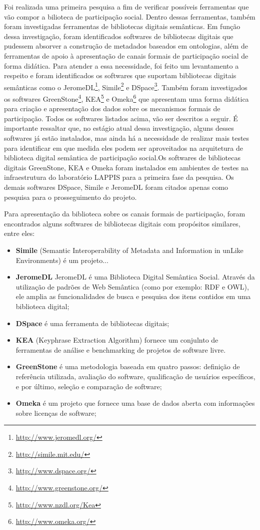 Foi realizada uma primeira pesquisa a fim de verificar possíveis ferramentas que vão compor a bilioteca de participação social. Dentro dessas ferramentas, também foram investigadas ferramentas de bibliotecas digitais semânticas. Em função dessa investigação, foram identificados softwares de bibliotecas digitais que pudessem absorver a construção de metadados baseados em ontologias, além de ferramentas de apoio à apresentação de canais formais de participação social de forma didática. 
%
Para atender a essa necessidade, foi feito um levantamento a respeito e foram identificados os softwares que suportam bibliotecas digitais semânticas como  o JeromeDL\footnote{\url{http://www.jeromedl.org/}}, Simile\footnote{\url{http://simile.mit.edu/}} e DSpace\footnote{\url{http://www.dspace.org/}}. Também foram investigados os softwares GreenStone\footnote{\url{http://www.greenstone.org/}}, KEA\footnote{\url{http://www.nzdl.org/Kea}} e Omeka\footnote{\url{http://www.omeka.org/}} que apresentam uma forma didática para criação e apresentação dos dados sobre os mecanismos formais de participação. Todos os softwares listados acima, vão ser descritos a seguir.
%
É importante ressaltar que, no estágio atual dessa investigação, alguns desses softwares já estão instalados, mas ainda há a necessidade de realizar mais testes para identificar em que medida eles podem ser aproveitados na arquitetura de biblioteca digital semântica de participação social.Os softwares  de bibliotecas digitais GreenStone, KEA e Omeka foram instalados em ambientes de testes na infraestrutura do laboratório LAPPIS para a primeira fase da pesquisa. Os demais softwares DSpace, Simile e JeromeDL foram citados apenas como pesquisa para o prosseguimento do projeto.

Para apresentação da biblioteca sobre os canais formais de participação, foram encontrados alguns softwares de bibliotecas digitais com propósitos similares, entre eles:

\begin{itemize}
\item \textbf{Simile} (Semantic Interoperability of Metadata and Information in unLike Environments) é um projeto...
\item \textbf{JeromeDL} JeromeDL é uma Biblioteca Digital Semântica Social. Através da utilização de padrões de Web Semântica (como por exemplo: RDF e OWL), ele amplia as funcionalidades de busca e pesquisa dos itens contidos em uma biblioteca digital;
\item \textbf{DSpace} é uma ferramenta de bibliotecas digitais;
\item \textbf{KEA} (Keyphrase Extraction Algorithm) fornece um conjulnto de ferramentas de análise e benchmarking de projetos de software livre.
\item \textbf{GreenStone} é uma metodologia baseada em quatro passos: definição de referência utilizada, avaliação do software, qualificação de usuários específicos, e por último, seleção e comparação de software;
\item \textbf{Omeka}  é um projeto que fornece uma base de dados aberta com informações sobre licenças de software;
\end{itemize}

